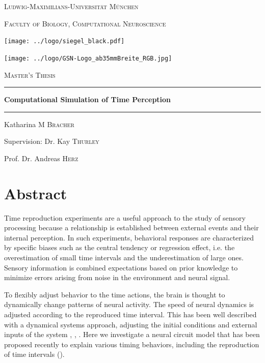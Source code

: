 \documentclass[10pt]{article}
\begin{document}
\begin{titlepage}
	\centering
	{\scshape\LARGE Ludwig-Maximilians-Universität München \par}
	{\scshape\large Faculty of Biology, Computational Neuroscience \par}
	\vspace{0.7cm}
	\texttt{[image: ../logo/siegel\_black.pdf]}\par
	\texttt{[image: ../logo/GSN-Logo\_ab35mmBreite\_RGB.jpg]}\par
	\vspace{0.5cm}

	{\scshape\LARGE Master's Thesis}
	\rule{\textwidth}{1.pt}
	{\huge\bfseries Computational Simulation of Time Perception \par}
	\rule{\textwidth}{1.pt}
	\vspace{0.5cm}

	{\Large Katharina \textsc{M Bracher} \par}
	\vspace{0.7cm}

	{\large Supervision: Dr. Kay \textsc{Thurley} \par}
	{\large Prof. Dr. Andreas \textsc{Herz} \par}
\end{titlepage}


\normalsize
\tableofcontents

\pagebreak

\section*{Abstract}
Time reproduction experiments are a useful approach to the study of sensory processing because a relationship is established between external events and their internal perception.
In such experiments, behavioral responses are characterized by specific biases such as the central tendency or regression effect, i.e. the overestimation of small time intervals and the underestimation of large ones.
Sensory information is combined expectations based on prior knowledge to minimize errors arising from noise in the environment and neural signal. 

To flexibly adjust behavior to the time actions, the brain is thought to dynamically change patterns of neural activity. The speed of neural dynamics is adjusted according to the reproduced time interval.
This has been well described with a dynamical systems approach, adjusting the initial conditions and external inputs of the system \cite{Paton2018}, \cite{Issa2020}, \cite{Zhou2022}.
Here we investigate a neural circuit model that has been proposed recently to explain various timing behaviors, including the reproduction of time intervals (\cite{Egger2020}).
\end{document}
